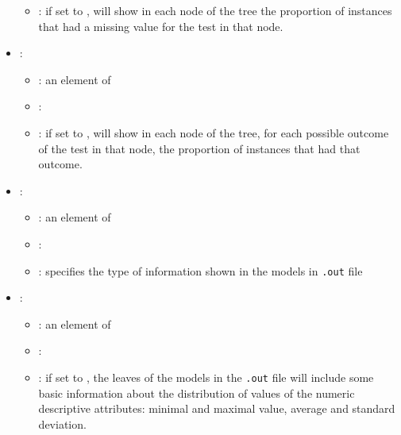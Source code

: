 \begin{itemize}
\begin{itemize}
                \item \optionDescrption{}: if set to , \clus{} will show in each node of the tree the proportion of instances that had a missing value for the test in that node.
           \end{itemize}
    \item {}:
           \begin{itemize}
                \item \optionPossibleValues{}: an element of 
                \item \optionDefaultValue{}: 
                \item \optionDescrption{}:  if set to , \clus{} will show in each node of the tree, for each possible outcome of the test in that node, the proportion of instances that had that outcome.
           \end{itemize}
    \item {}:
           \begin{itemize}
                \item \optionPossibleValues{}: an element of 
                \item \optionDefaultValue{}: 
                \item \optionDescrption{}: specifies the type of information shown in the models in \texttt{.out} file
           \end{itemize}
    \item {}:
           \begin{itemize}
                \item \optionPossibleValues{}: an element of  
                \item \optionDefaultValue{}: 
                \item \optionDescrption{}: if set to , the leaves of the models in the \texttt{.out} file will include some basic information about the distribution of values of the numeric
                descriptive attributes: minimal and maximal value, average and standard deviation.
           \end{itemize}
\end{itemize}
